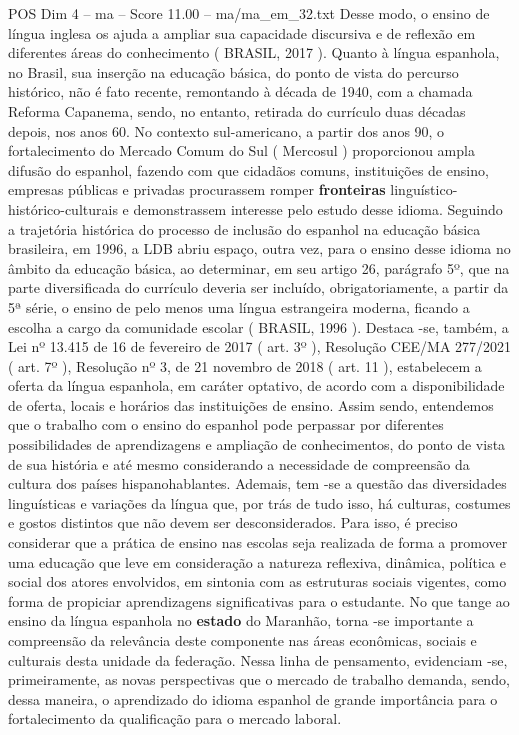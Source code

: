 \begin{textsample}{POS Dim 4 – ma – Score 11.00 – ma/ma\_em\_32.txt}
Desse modo, o ensino de língua inglesa os ajuda a ampliar sua capacidade discursiva e de reflexão em diferentes áreas do conhecimento ( BRASIL, 2017 ).
Quanto à língua espanhola, no Brasil, sua inserção na educação básica, do ponto de vista do percurso histórico, não é fato recente, remontando à década de 1940, com a chamada Reforma Capanema, sendo, no entanto, retirada do currículo duas décadas depois, nos anos 60.
No contexto sul-americano, a partir dos anos 90, o fortalecimento do Mercado Comum do Sul ( Mercosul ) proporcionou ampla difusão do espanhol, fazendo com que cidadãos comuns, instituições de ensino, empresas públicas e privadas procurassem romper \textbf{fronteiras} linguístico-histórico-culturais e demonstrassem interesse pelo estudo desse idioma.
Seguindo a trajetória histórica do processo de inclusão do espanhol na educação básica brasileira, em 1996, a LDB abriu espaço, outra vez, para o ensino desse idioma no âmbito da educação básica, ao determinar, em seu artigo 26, parágrafo 5º, que na parte diversificada do currículo deveria ser incluído, obrigatoriamente, a partir da 5ª série, o ensino de pelo menos uma língua estrangeira moderna, ficando a escolha a cargo da comunidade escolar ( BRASIL, 1996 ).
Destaca -se, também, a Lei nº 13.415 de 16 de fevereiro de 2017 ( art. 3º ), Resolução CEE/MA 277/2021 ( art. 7º ), Resolução nº 3, de 21 novembro de 2018 ( art. 11 ), estabelecem a oferta da língua espanhola, em caráter optativo, de acordo com a disponibilidade de oferta, locais e horários das instituições de ensino.
Assim sendo, entendemos que o trabalho com o ensino do espanhol pode perpassar por diferentes possibilidades de aprendizagens e ampliação de conhecimentos, do ponto de vista de sua história e até mesmo considerando a necessidade de compreensão da cultura dos países hispanohablantes.
Ademais, tem -se a questão das diversidades linguísticas e variações da língua que, por trás de tudo isso, há culturas, costumes e gostos distintos que não devem ser desconsiderados.
Para isso, é preciso considerar que a prática de ensino nas escolas seja realizada de forma a promover uma educação que leve em consideração a natureza reflexiva, dinâmica, política e social dos atores envolvidos, em sintonia com as estruturas sociais vigentes, como forma de propiciar aprendizagens significativas para o estudante.
No que tange ao ensino da língua espanhola no \textbf{estado} do Maranhão, torna -se importante a compreensão da relevância deste componente nas áreas econômicas, sociais e culturais desta unidade da federação.
Nessa linha de pensamento, evidenciam -se, primeiramente, as novas perspectivas que o mercado de trabalho demanda, sendo, dessa maneira, o aprendizado do idioma espanhol de grande importância para o fortalecimento da qualificação para o mercado laboral.

\end{textsample}
